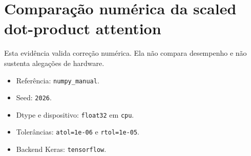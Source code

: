 \chapter{Comparação numérica da scaled dot-product attention}

\begin{icquote}
Esta evidência valida correção numérica. Ela não compara desempenho e não sustenta alegações de hardware.
\end{icquote}

\begin{itemize}
\item Referência: \texttt{numpy\_\allowbreak{}manual}.
\item Seed: \texttt{2026}.
\item Dtype e dispositivo: \texttt{float32} em \texttt{cpu}.
\item Tolerâncias: \texttt{atol=1e-06} e \texttt{rtol=1e-05}.
\item Backend Keras: \texttt{tensorflow}.
\end{itemize}

